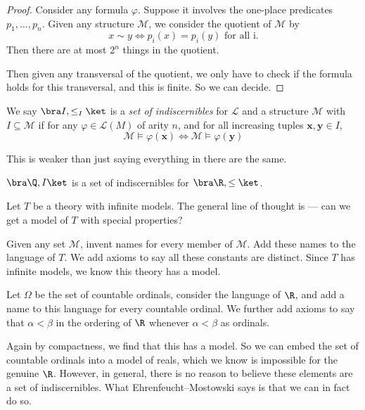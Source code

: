 \documentclass[a4paper]{article}
\begin{document}
\begin{proof}
  Consider any formula $\varphi$. Suppose it involves the one-place predicates $p_1, \dots, p_n$. Given any structure $\mathcal{M}$, we consider the quotient of $\mathcal{M}$ by
  \[
    x \sim y \Leftrightarrow p_i (x) = p_i(y) \text{ for all i}.
  \]
  Then there are at most $2^n$ things in the quotient.

  Then given any transversal of the quotient, we only have to check if the formula holds for this transversal, and this is finite. So we can decide.
\end{proof}

\begin{defi}
  We say $\bra I, \leq_I\ket$ is a \emph{set of indiscernibles} for $\mathcal{L}$ and a structure $\mathcal{M}$ with $I \subseteq \mathcal{M}$ if for any $\varphi \in \mathcal{L}(M)$ of arity $n$, and for all increasing tuples $\mathbf{x}, \mathbf{y} \in I$,
  \[
    \mathcal{M} \vDash \varphi(\mathbf{x}) \Longleftrightarrow \mathcal{M} \vDash \varphi(\mathbf{y})
  \]
\end{defi}
This is weaker than just saying everything in there are the same.

\begin{eg}
  $\bra \Q, I\ket$ is a set of indiscernibles for $\bra \R, \leq\ket$.
\end{eg}

Let $T$ be a theory with infinite models. The general line of thought is --- can we get a model of $T$ with special properties?

Given any set $\mathcal{M}$, invent names for every member of $\mathcal{M}$. Add these names to the language of $T$. We add axioms to say all these constants are distinct. Since $T$ has infinite models, we know this theory has a model.

Let $\Omega$ be the set of countable ordinals, consider the language of $\R$, and add a name to this language for every countable ordinal. We further add axioms to say that $\alpha < \beta$ in the ordering of $\R$ whenever $\alpha < \beta$ as ordinals.

Again by compactness, we find that this has a model. So we can embed the set of countable ordinals into a model of reals, which we know is impossible for the genuine $\R$. However, in general, there is no reason to believe these elements are a set of indiscernibles. What Ehrenfeucht--Mostowski says is that we can in fact do so.
\end{document}
